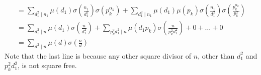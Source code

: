 \begin{enumerate}[label=\ilabel]
\begin{gather*}
            = \sum_{d_1^2 \mid n_1} \mu(d_1) \sigma(\frac{n_1}{d_1^2}) \sigma(p_k^{\alpha_k}) + \sum_{d_1^2 \mid n_1} \mu(d_1) \mu(p_k) \sigma(\frac{n_1}{d_1^2}) \sigma(\frac{p_k^{\alpha_k}}{p_k^2}) \\
            = \sum_{d_1^2 \mid n} \mu(d_1) \sigma(\frac{n}{d_1^2}) + \sum_{p_k^2 d_1^2 \mid n} \mu(d_1 p_k) \sigma(\frac{n}{p_k^2 d_1^2}) + 0 + \dots + 0 \\
            = \sum_{d^2 \mid n} \mu(d) \sigma(\frac{n}{d})
        \end{gather*}
        Note that the last line is because any other square divisor of $n$, other than $d_1^2$ and $p_k^2 d_1^2$, is not square free. 
\end{enumerate}